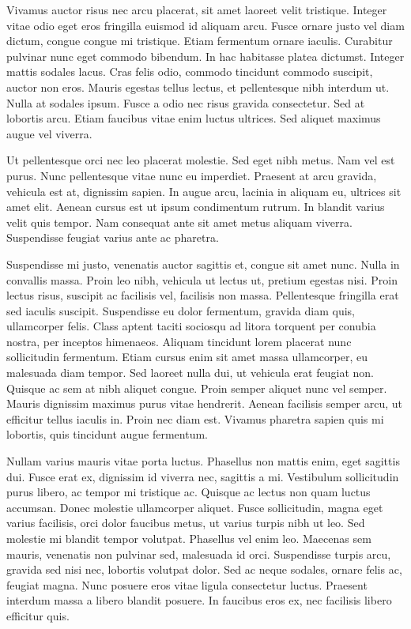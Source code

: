 \documentclass[11pt]{cicsletter}
\begin{document}
\begin{letter}
    Vivamus auctor risus nec arcu placerat, sit amet laoreet velit tristique. Integer vitae odio eget eros fringilla euismod id aliquam arcu. Fusce ornare justo vel diam dictum, congue congue mi tristique. Etiam fermentum ornare iaculis. Curabitur pulvinar nunc eget commodo bibendum. In hac habitasse platea dictumst. Integer mattis sodales lacus. Cras felis odio, commodo tincidunt commodo suscipit, auctor non eros. Mauris egestas tellus lectus, et pellentesque nibh interdum ut. Nulla at sodales ipsum. Fusce a odio nec risus gravida consectetur. Sed at lobortis arcu. Etiam faucibus vitae enim luctus ultrices. Sed aliquet maximus augue vel viverra.

    Ut pellentesque orci nec leo placerat molestie. Sed eget nibh metus. Nam vel est purus. Nunc pellentesque vitae nunc eu imperdiet. Praesent at arcu gravida, vehicula est at, dignissim sapien. In augue arcu, lacinia in aliquam eu, ultrices sit amet elit. Aenean cursus est ut ipsum condimentum rutrum. In blandit varius velit quis tempor. Nam consequat ante sit amet metus aliquam viverra. Suspendisse feugiat varius ante ac pharetra.

    Suspendisse mi justo, venenatis auctor sagittis et, congue sit amet nunc. Nulla in convallis massa. Proin leo nibh, vehicula ut lectus ut, pretium egestas nisi. Proin lectus risus, suscipit ac facilisis vel, facilisis non massa. Pellentesque fringilla erat sed iaculis suscipit. Suspendisse eu dolor fermentum, gravida diam quis, ullamcorper felis. Class aptent taciti sociosqu ad litora torquent per conubia nostra, per inceptos himenaeos. Aliquam tincidunt lorem placerat nunc sollicitudin fermentum. Etiam cursus enim sit amet massa ullamcorper, eu malesuada diam tempor. Sed laoreet nulla dui, ut vehicula erat feugiat non. Quisque ac sem at nibh aliquet congue. Proin semper aliquet nunc vel semper. Mauris dignissim maximus purus vitae hendrerit. Aenean facilisis semper arcu, ut efficitur tellus iaculis in. Proin nec diam est. Vivamus pharetra sapien quis mi lobortis, quis tincidunt augue fermentum.

    Nullam varius mauris vitae porta luctus. Phasellus non mattis enim, eget sagittis dui. Fusce erat ex, dignissim id viverra nec, sagittis a mi. Vestibulum sollicitudin purus libero, ac tempor mi tristique ac. Quisque ac lectus non quam luctus accumsan. Donec molestie ullamcorper aliquet. Fusce sollicitudin, magna eget varius facilisis, orci dolor faucibus metus, ut varius turpis nibh ut leo. Sed molestie mi blandit tempor volutpat. Phasellus vel enim leo. Maecenas sem mauris, venenatis non pulvinar sed, malesuada id orci. Suspendisse turpis arcu, gravida sed nisi nec, lobortis volutpat dolor. Sed ac neque sodales, ornare felis ac, feugiat magna. Nunc posuere eros vitae ligula consectetur luctus. Praesent interdum massa a libero blandit posuere. In faucibus eros ex, nec facilisis libero efficitur quis.


\end{letter}
\end{document}
